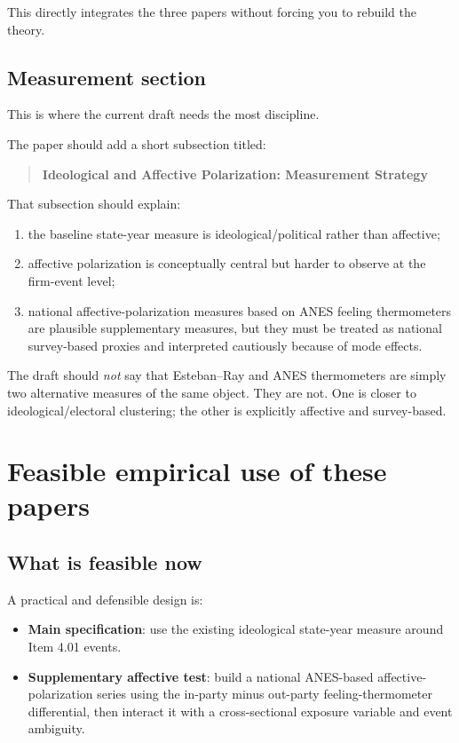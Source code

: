 \documentclass[12pt]{article}
\begin{document}
This directly integrates the three papers without forcing you to rebuild the theory.

\subsection{Measurement section}

This is where the current draft needs the most discipline.

The paper should add a short subsection titled:

\begin{quote}
\textbf{Ideological and Affective Polarization: Measurement Strategy}
\end{quote}

That subsection should explain:
\begin{enumerate}
    \item the baseline state-year measure is ideological/political rather than affective;
    \item affective polarization is conceptually central but harder to observe at the firm-event level;
    \item national affective-polarization measures based on ANES feeling thermometers are plausible supplementary measures, but they must be treated as national survey-based proxies and interpreted cautiously because of mode effects.
\end{enumerate}

The draft should \emph{not} say that Esteban--Ray and ANES thermometers are simply two alternative measures of the same object. They are not. One is closer to ideological/electoral clustering; the other is explicitly affective and survey-based.

\section{Feasible empirical use of these papers}

\subsection{What is feasible now}

A practical and defensible design is:
\begin{itemize}
    \item \textbf{Main specification}: use the existing ideological state-year measure around Item 4.01 events.
    \item \textbf{Supplementary affective test}: build a national ANES-based affective-polarization series using the in-party minus out-party feeling-thermometer differential, then interact it with a cross-sectional exposure variable and event ambiguity.
\end{itemize}
\end{document}
